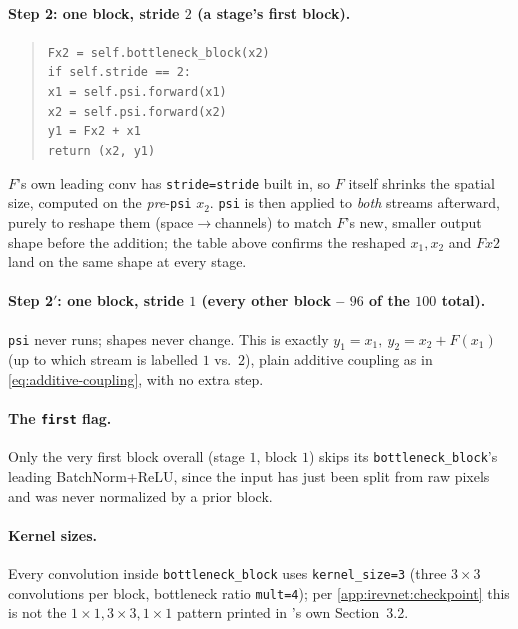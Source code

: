 \paragraph{Step 2: one block, stride $2$ (a stage's first block).}
\begin{quote}
\begin{flushleft}
\texttt{Fx2 = self.bottleneck\_block(x2)}\\
\texttt{if self.stride == 2:}\\
\texttt{\phantom{if }x1 = self.psi.forward(x1)}\\
\texttt{\phantom{if }x2 = self.psi.forward(x2)}\\
\texttt{y1 = Fx2 + x1}\\
\texttt{return (x2, y1)}
\end{flushleft}
\end{quote}
$F$'s own leading conv has \texttt{stride=stride} built in, so $F$ itself shrinks the spatial size,
computed on the \emph{pre}-\texttt{psi} $x_2$. \texttt{psi} is then applied to \emph{both} streams
afterward, purely to reshape them (space$\to$channels) to match $F$'s new, smaller output shape before the
addition; the table above confirms the reshaped $x_1,x_2$ and $Fx2$ land on the same shape at every stage.

\paragraph{Step 2$'$: one block, stride $1$ (every other block -- $96$ of the $100$ total).} \texttt{psi}
never runs; shapes never change. This is exactly $y_1=x_1,\ y_2=x_2+F(x_1)$ (up to which stream is labelled
$1$ vs.\ $2$), plain additive coupling as in \cref{eq:additive-coupling}, with no extra step.

\paragraph{The \texttt{first} flag.} Only the very first block overall (stage $1$, block $1$) skips its
\texttt{bottleneck\_block}'s leading BatchNorm+ReLU, since the input has just been split from raw pixels and
was never normalized by a prior block.

\paragraph{Kernel sizes.} Every convolution inside \texttt{bottleneck\_block} uses \texttt{kernel\_size=3}
(three $3\times3$ convolutions per block, bottleneck ratio \texttt{mult=4}); per
\cref{app:irevnet:checkpoint} this is not the $1\times1,3\times3,1\times1$ pattern printed in
\cite{jacobsen2018}'s own Section~3.2.

